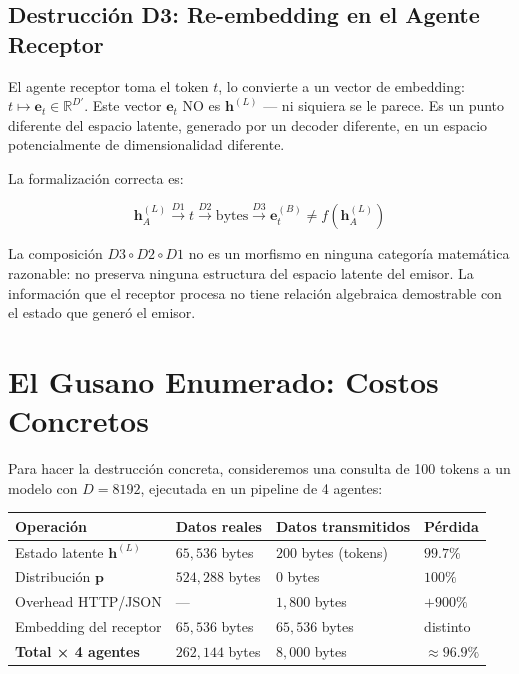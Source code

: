 \subsection{Destrucción D3: Re-embedding en el Agente Receptor}

El agente receptor toma el token $t$, lo convierte a un vector de embedding:
$t \mapsto \mathbf{e}_t \in \mathbb{R}^{D'}$. Este vector $\mathbf{e}_t$ NO es
$\mathbf{h}^{(L)}$ --- ni siquiera se le parece. Es un punto diferente del
espacio latente, generado por un decoder diferente, en un espacio potencialmente
de dimensionalidad diferente.

La formalización correcta es:

\begin{equation}
\mathbf{h}_A^{(L)} \xrightarrow{D1} t \xrightarrow{D2} \text{bytes} \xrightarrow{D3} \mathbf{e}_{t}^{(B)} \ne f(\mathbf{h}_A^{(L)})
\end{equation}

La composición $D3 \circ D2 \circ D1$ no es un morfismo en ninguna categoría
matemática razonable: no preserva ninguna estructura del espacio latente del
emisor. La información que el receptor procesa no tiene relación algebraica
demostrable con el estado que generó el emisor.

\section{El Gusano Enumerado: Costos Concretos}

Para hacer la destrucción concreta, consideremos una consulta de 100 tokens
a un modelo con $D = 8192$, ejecutada en un pipeline de 4 agentes:

\begin{tabular}{llll}
\hline
\textbf{Operación} & \textbf{Datos reales} & \textbf{Datos transmitidos} & \textbf{Pérdida} \\
\hline
Estado latente $\mathbf{h}^{(L)}$ & $65{,}536$ bytes & $200$ bytes (tokens) & $99.7\%$ \\
Distribución $\mathbf{p}$ & $524{,}288$ bytes & $0$ bytes & $100\%$ \\
Overhead HTTP/JSON & --- & $1{,}800$ bytes & $+900\%$ \\
Embedding del receptor & $65{,}536$ bytes & $65{,}536$ bytes & distinto \\
\hline
\textbf{Total × 4 agentes} & $262{,}144$ bytes & $8{,}000$ bytes & $\approx 96.9\%$ \\
\hline


\end{tabular}


